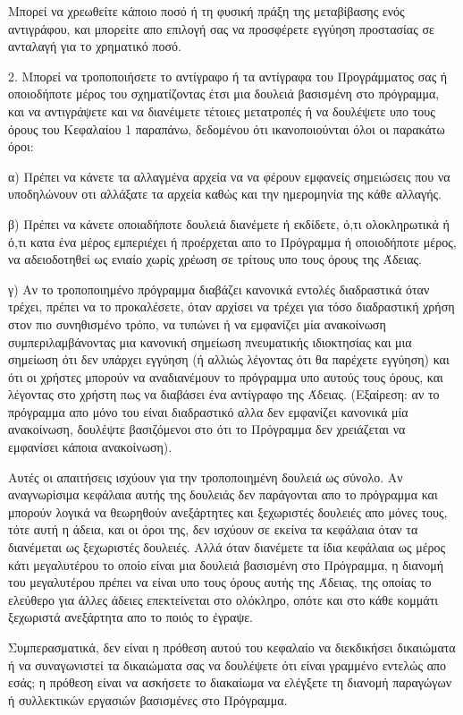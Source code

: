 \begin{small}
  Μπορεί να χρεωθείτε κάποιο ποσό ή τη φυσική πράξη της μεταβίβασης ενός αντιγράφου, και μπορείτε απο επιλογή σας να προσφέρετε εγγύηση προστασίας σε ανταλαγή για το χρηματικό ποσό.

2. Μπορεί να τροποποιήσετε το αντίγραφο ή τα αντίγραφα του Προγράμματος σας ή οποιοδήποτε μέρος του σχηματίζοντας έτσι μια δουλειά βασισμένη στο πρόγραμμα, και να αντιγράψετε και να διανέιμετε τέτοιες μετατροπές ή να δουλέψετε υπο τους όρους του Κεφαλαίου 1 παραπάνω, δεδομένου ότι ικανοποιούνται όλοι οι παρακάτω όροι:

    α) Πρέπει να κάνετε τα αλλαγμένα αρχεία να να φέρουν εμφανείς σημειώσεις που να υποδηλώνουν οτι αλλάξατε τα αρχεία καθώς και την ημερομηνία της κάθε αλλαγής. 

    β) Πρέπει να κάνετε οποιαδήποτε δουλειά διανέμετε ή εκδίδετε, ό,τι ολοκληρωτικά ή ό,τι κατα ένα μέρος εμπεριέχει ή προέρχεται απο το Πρόγραμμα ή οποιοδήποτε μέρος, να αδειοδοτηθεί ως ενιαίο χωρίς χρέωση σε τρίτους υπο τους όρους της Άδειας. 

    γ) Αν το τροποποιημένο πρόγραμμα διαβάζει κανονικά εντολές διαδραστικά όταν τρέχει, πρέπει να το προκαλέσετε, όταν αρχίσει να τρέχει για τόσο διαδραστική χρήση στον πιο συνηθισμένο τρόπο, να τυπώνει ή να εμφανίζει μία ανακοίνωση συμπεριλαμβάνοντας μια κανονική σημείωση πνευματικής ιδιοκτησίας και μια σημείωση ότι δεν υπάρχει εγγύηση (ή αλλιώς λέγοντας ότι θα παρέχετε εγγύηση) και ότι οι χρήστες μπορούν να αναδιανέμουν το πρόγραμμα υπο αυτούς τους όρους, και λέγοντας στο χρήστη πως να διαβάσει ένα αντίγραφο της Άδειας. (Εξαίρεση: αν το πρόγραμμα απο μόνο του είναι διαδραστικό αλλα δεν εμφανίζει κανονικά μία ανακοίνωση, δουλέψτε βασιζόμενοι στο ότι το Πρόγραμμα δεν χρειάζεται να εμφανίσει κάποια ανακοίνωση). 

Αυτές οι απαιτήσεις ισχύουν για την τροποποιημένη δουλειά ως σύνολο. Αν αναγνωρίσιμα κεφάλαια αυτής της δουλειάς δεν παράγονται απο το πρόγραμμα και μπορούν λογικά να θεωρηθούν ανεξάρτητες και ξεχωριστές δουλειές απο μόνες τους, τότε αυτή η άδεια, και οι όροι της, δεν ισχύουν σε εκείνα τα κεφάλαια όταν τα διανέμεται ως ξεχωριστές δουλειές. Αλλά όταν διανέμετε τα ίδια κεφάλαια ως μέρος κάτι μεγαλυτέρου το οποίο είναι μια δουλειά βασισμένη στο Πρόγραμμα, η διανομή του μεγαλυτέρου πρέπει να είναι υπο τους όρους αυτής της Άδειας, της οποίας το ελεύθερο για άλλες άδειες επεκτείνεται στο ολόκληρο, οπότε και στο κάθε κομμάτι ξεχωριστά ανεξάρτητα απο το ποιός το έγραψε.

Συμπερασματικά, δεν είναι η πρόθεση αυτού του κεφαλαίο να διεκδικήσει δικαιώματα ή να συναγωνιστεί τα δικαιώματα σας να δουλέψετε ότι είναι γραμμένο εντελώς απο εσάς; η πρόθεση είναι να ασκήσετε το διακαίωμα να ελέγξετε τη διανομή παραγώγων ή συλλεκτικών εργασιών βασισμένες στο Πρόγραμμα.


\end{small}
